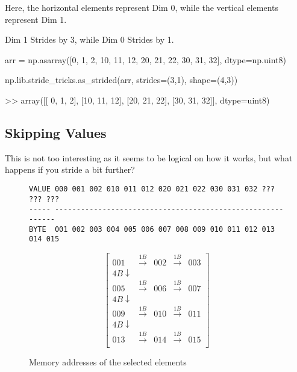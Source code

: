 \documentclass[oneside, 12pt]{report}
\begin{document}
\begin{shaded}
Here, the horizontal elements represent Dim 0, while the vertical elements represent Dim 1.

Dim 1 Strides by 3, while Dim 0 Strides by 1.
\end{shaded}

\begin{python}
arr = np.asarray([0, 1, 2,
                  10, 11, 12,
                  20, 21, 22,
                  30, 31, 32], dtype=np.uint8)
 
np.lib.stride_tricks.as_strided(arr, strides=(3,1), shape=(4,3))
 
>> array([[ 0,  1,  2],
          [10, 11, 12],
          [20, 21, 22],
          [30, 31, 32]], dtype=uint8)
\end{python}

\subsection{Skipping Values}

This is not too interesting as it seems to be logical on how it works, but what happens if you stride a bit further?

\begin{figure}[H]
\begin{verbatim}
VALUE 000 001 002 010 011 012 020 021 022 030 031 032 ??? ??? ???
----- -----------------------------------------------------------
BYTE  001 002 003 004 005 006 007 008 009 010 011 012 013 014 015
\end{verbatim}
\end{figure}

\begin{figure}[H]
\begin{equation*}
\begin{bmatrix}
001 & \xrightarrow{1B} & 002 &\xrightarrow{1B} & 003 \\
4B \downarrow \\
005 & \xrightarrow{1B} & 006 &\xrightarrow{1B} & 007 \\
4B \downarrow \\
009 & \xrightarrow{1B} & 010 &\xrightarrow{1B} & 011 \\
4B \downarrow \\
013 & \xrightarrow{1B} & 014 &\xrightarrow{1B} & 015 \\
\end{bmatrix}
\end{equation*}
\caption{Memory addresses of the selected elements}
\end{figure}
\end{document}
